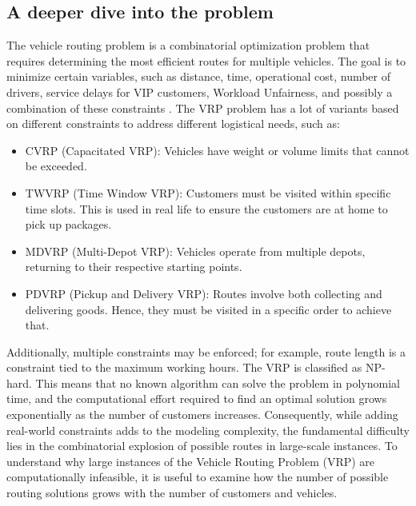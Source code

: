 \documentclass[a4paper]{report}
\begin{document}
{\begin{itemize}
\subsection{A deeper dive into the problem}
The vehicle routing problem is a combinatorial optimization problem that requires determining the most efficient routes for multiple vehicles. The goal is to minimize certain variables, such as distance, time, operational cost, number of drivers, service delays for VIP customers, Workload Unfairness, and possibly a combination of these constraints \cite {VRPWithMulPrios}. 
\newline
The VRP problem has a lot of variants based on different constraints to address different logistical needs, such as:
\begin{itemize}
    \item CVRP (Capacitated VRP): Vehicles have weight or volume limits that cannot be exceeded.
\end{itemize}
\begin{itemize}
    \item TWVRP (Time Window VRP): Customers must be visited within specific time slots. This is used in real life to ensure the customers are at home to pick up packages.
\end{itemize}
\begin{itemize}
    \item MDVRP (Multi-Depot VRP): Vehicles operate from multiple depots, returning to their respective starting points.
\end{itemize}
\begin{itemize}
    \item PDVRP (Pickup and Delivery VRP): Routes involve both collecting and delivering goods. Hence, they must be visited in a specific order to achieve that.
\end{itemize}
Additionally, multiple constraints may be enforced; for example, route length is a constraint tied to the maximum working hours.
\newline
The VRP is classified as NP-hard. This means that no known algorithm can solve the problem in polynomial time, and the computational effort required to find an optimal solution grows exponentially as the number of customers increases. Consequently, while adding real-world constraints adds to the modeling complexity\cite{complexity}, the fundamental difficulty lies in the combinatorial explosion of possible routes in large-scale instances. 
To understand why large instances of the Vehicle Routing Problem (VRP) are computationally infeasible, it is useful to examine how the number of possible routing solutions grows with the number of customers and vehicles.


\end{itemize}}
\end{document}
